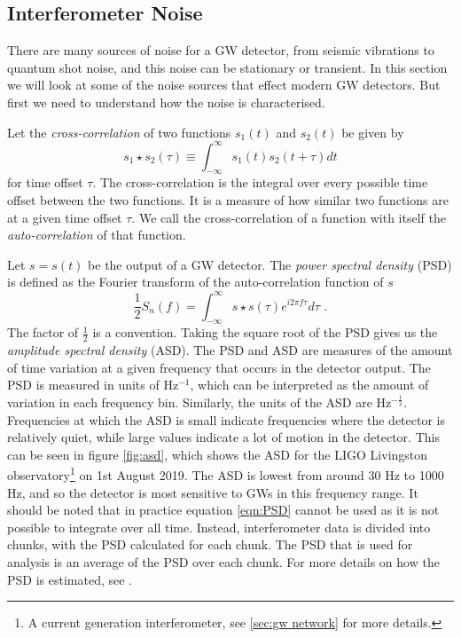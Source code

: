 \documentclass[11pt]{cuthesis}
\newcommand{\fs}{\text{ .}}
\newcommand{\infint}{\int^\infty_{-\infty} }
\begin{document}
\subsection{Interferometer Noise}
There are many sources of noise for a GW detector, from seismic vibrations to quantum shot noise, and this noise can be stationary or transient. In this section we will look at some of the noise sources that effect modern GW detectors. But first we need to understand how the noise is characterised. 

Let the \textit{cross-correlation} of two functions $s_1(t)$ and $s_2(t)$ be given by
\begin{equation}
s_1 \star s_2 (\tau) \equiv \infint s_1(t) s_2 (t+\tau)dt
\end{equation}
for time offset $\tau$. The cross-correlation is the integral over every possible time offset between the two functions. It is a measure of how similar two functions are at a given time offset $\tau$. We call the cross-correlation of a function with itself the \textit{auto-correlation} of that function.

Let $s=s(t)$ be the  output of a GW detector. The \textit{power spectral density} (PSD) is defined as the Fourier transform of the auto-correlation function of $s$
\begin{equation} \label{eqn:PSD}
\frac{1}{2} S_n(f)=\infint s \star s(\tau)e^{i 2\pi f \tau} d\tau \fs
\end{equation}
The factor of $\frac{1}{2}$ is a convention. Taking the square root of the PSD gives us the \textit{amplitude spectral density} (ASD). The PSD and ASD are measures of the amount of time variation at a given frequency that occurs in the detector output. The PSD is measured in units of Hz$^{-1}$, which can be interpreted as the amount of variation in each frequency bin. Similarly, the units of the ASD are Hz$^{-\frac{1}{2}}$. Frequencies at which the ASD is small indicate frequencies where the detector is relatively quiet, while large values indicate a lot of motion in the detector. This can be seen in figure \ref{fig:asd}, which shows the ASD for the LIGO Livingston observatory\footnote{A current generation interferometer, see \ref{sec:gw network} for more details.} on 1st August 2019. The ASD is lowest from around 30 Hz to 1000 Hz, and so the detector is most sensitive to GWs in this frequency range. It should be noted that in practice equation \ref{eqn:PSD} cannot be used as it is not possible to integrate over all time. Instead, interferometer data is divided into chunks, with the PSD calculated for each chunk. The PSD that is used for analysis is an average of the PSD over each chunk. For more details on how the PSD is estimated, see \cite{pycbc_Allen:2005}.  
\end{document}
